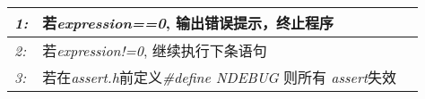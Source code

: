 \begin{tabular}{lp{4.5cm} l}
\textit{1:} & 若\textit{expression==0}, 输出错误提示，终止程序 \\ \hline
\textit{2:} & 若\textit{expression!=0}, 继续执行下条语句 \\ \hline
\textit{3:} & 若在\textit{assert.h}前定义\textit{\#define NDEBUG} 则所有 \textit{assert}失效
\end{tabular} 